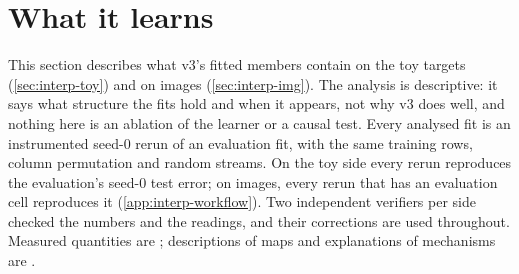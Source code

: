 \section{What it learns}\label{sec:interp}

This section describes what v3's fitted members contain on the toy targets (\cref{sec:interp-toy}) and on images (\cref{sec:interp-img}). The analysis is descriptive: it says what structure the fits hold and when it appears, not why v3 does well, and nothing here is an ablation of the learner or a causal test. Every analysed fit is an instrumented seed-0 rerun of an evaluation fit, with the same training rows, column permutation and random streams. On the toy side every rerun reproduces the evaluation's seed-0 test error; on images, every rerun that has an evaluation cell reproduces it (\cref{app:interp-workflow}). Two independent verifiers per side checked the numbers and the readings, and their corrections are used throughout. Measured quantities are ; descriptions of maps and explanations of mechanisms are .

